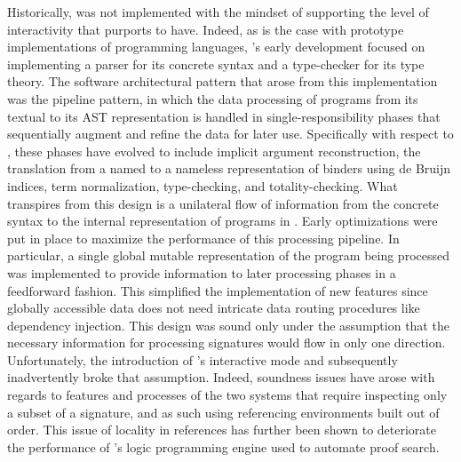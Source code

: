 Historically, \Beluga was not implemented with the mindset of supporting the level of interactivity that \Harpoon purports to have.
Indeed, as is the case with prototype implementations of programming languages, \Beluga's early development focused on implementing a parser for its concrete syntax and a type-checker for its type theory.
The software architectural pattern that arose from this implementation was the pipeline pattern, in which the data processing of programs from its textual to its \ac{AST} representation is handled in single-responsibility phases that sequentially augment and refine the data for later use.
Specifically with respect to \Beluga, these phases have evolved to include implicit argument reconstruction, the translation from a named to a nameless representation of binders using de Bruijn indices, term normalization, type-checking, and totality-checking.
What transpires from this design is a unilateral flow of information from the concrete syntax to the internal representation of programs in \Beluga.
Early optimizations were put in place to maximize the performance of this processing pipeline.
In particular, a single global mutable representation of the \Beluga program being processed was implemented to provide information to later processing phases in a feedforward fashion.
This simplified the implementation of new features since globally accessible data does not need intricate data routing procedures like dependency injection.
This design was sound only under the assumption that the necessary information for processing \Beluga signatures would flow in only one direction.
Unfortunately, the introduction of \Beluga's interactive mode and subsequently \Harpoon inadvertently broke that assumption.
Indeed, soundness issues have arose with regards to features and processes of the two systems that require inspecting only a subset of a signature, and as such using referencing environments built out of order.
This issue of locality in references has further been shown to deteriorate the performance of \Beluga's logic programming engine used to automate proof search.



